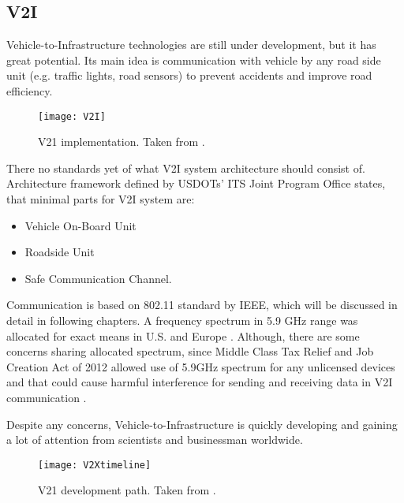 \subsection{V2I}
% 
Vehicle-to-Infrastructure technologies are still under development, but it has great potential. Its main idea is communication with vehicle by any road side unit (e.g. traffic lights, road sensors) to prevent accidents and improve road efficiency.\par
% 
\begin{figure}[h]
\texttt{[image: V2I]}
\caption{V21 implementation. Taken from \cite{U.S.GovernmentAccountabilityOffice2015IntelligentExist}.}
\label{fig:V2Iimplementation}
\centering
\end{figure}
% 
There no standards yet of what V2I system architecture should consist of. Architecture framework defined by USDOTs' ITS Joint Program Office \cite{Dr.Gaspar2014HighlySystems} states, that minimal parts for V2I system are:
\begin{itemize}[noitemsep,nolistsep]
    \item Vehicle On-Board Unit
    \item Roadside Unit
    \item Safe Communication Channel.
\end{itemize}
% 
Communication is based on 802.11 standard by IEEE, which will be discussed in detail in following chapters. A frequency spectrum in 5.9 GHz range was allocated for exact means in U.S. and Europe \cite{2011TheTechnology}. Although, there are some concerns sharing allocated spectrum, since Middle Class Tax Relief and Job Creation Act of 2012 allowed use of 5.9GHz spectrum for any unlicensed devices and that could cause harmful interference for sending and receiving data in V2I communication \cite{U.S.GovernmentAccountabilityOffice2015IntelligentExist}.\par
% 
Despite any concerns, Vehicle-to-Infrastructure is quickly developing and gaining a lot of attention from scientists and businessman worldwide.\par
%
\begin{figure}[h]
\texttt{[image: V2Xtimeline]}
\caption{V21 development path. Taken from \cite{U.S.GovernmentAccountabilityOffice2015IntelligentExist}.}
\label{fig:V2Idevelopment}
\centering
\end{figure}
